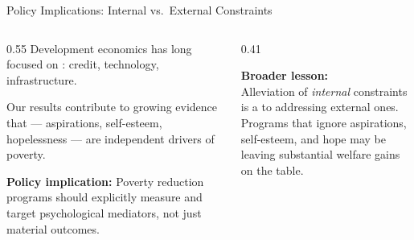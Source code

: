 \documentclass[aspectratio=169, 10pt]{beamer}
\begin{document}
\begin{frame}{Policy Implications: Internal vs.\ External Constraints}
  \begin{columns}
    \begin{column}{0.55\textwidth}
      Development economics has long focused on : credit, technology, infrastructure.

      \vspace{0.5em}
      Our results contribute to growing evidence that  --- aspirations, self-esteem, hopelessness --- are independent drivers of poverty.

      \vspace{0.5em}
      \textbf{Policy implication:} Poverty reduction programs should explicitly measure and target psychological mediators, not just material outcomes.
    \end{column}
    \begin{column}{0.41\textwidth}
      \begin{resultbox}
        \textbf{Broader lesson:}\\[0.4em]
        Alleviation of \emph{internal} constraints is a  to addressing external ones.\\[0.5em]
        Programs that ignore aspirations, self-esteem, and hope may be leaving substantial welfare gains on the table.
      \end{resultbox}
    \end{column}
  \end{columns}
\end{frame}
\end{document}
